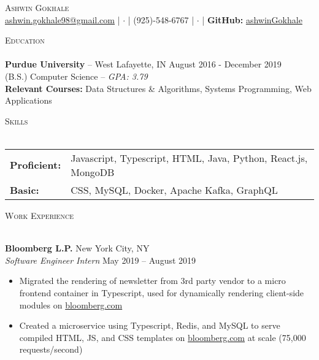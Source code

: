 \documentclass[letterpaper, 10pt]{article}
\newcommand{\lineunder} {
    \vspace*{-8pt} \\
    \hspace*{-18pt} \hrulefill \\
}
\newcommand{\header} [1] {
    {
        \hspace*{-18pt}\vspace*{6pt}
        {\large\textsc{#1}}
    }
    \vspace*{-6pt} \lineunder
}
\newcommand{\contact} [2] {
    \vspace*{-10pt}
    \begin{center}
        {\Huge \scshape {#1}}
        \vspace*{5pt}
        \\ #2
    \end{center}
    \vspace*{-10pt}
}
\begin{document}
\vspace*{20pt}



\vspace*{-10pt}
\contact{Ashwin Gokhale}{
	\href{mailto:ashwin.gokhale98@gmail.com}{ashwin.gokhale98@gmail.com} |
	$\cdot$ | (925)-548-6767 | $\cdot$ |
	\textbf{GitHub:}
	\href{https://goo.gl/R79aeK}{ashwinGokhale}
}

\vspace{10pt}

\header{Education}
\textbf{Purdue University} -- West Lafayette, IN
\hfill August 2016 - December 2019\\
(B.S.) Computer Science -- \textit{GPA: 3.79}
\\

\textbf{Relevant Courses:} Data Structures \& Algorithms, Systems Programming, Web Applications
\vspace{2mm}

\vspace{1mm}
\header{Skills}
\vspace{1mm}
\begin{tabular}{ l l }
	\textbf{Proficient:} & Javascript, Typescript, HTML, Java, Python, React.js, MongoDB \\
	\textbf{Basic:}      & CSS, MySQL, Docker, Apache Kafka, GraphQL \\
\end{tabular}
\vspace{2mm}

\header{Work Experience}
\vspace{1mm}

\textbf{Bloomberg L.P.} \hfill New York City, NY\\
\textit{Software Engineer Intern} \hfill May 2019 -- August 2019\\
\vspace{-1mm}
\begin{itemize} \itemsep 1pt
	\item Migrated the rendering of newsletter from 3rd party vendor to a micro frontend container in Typescript, used for dynamically rendering client-side modules on \href{https://www.bloomberg.com}{bloomberg.com}
	\item Created a microservice using Typescript, Redis, and MySQL to serve compiled HTML, JS, and CSS templates on
	\href{https://www.bloomberg.com}{bloomberg.com} at scale (75,000 requests/second)
\end{itemize}
\end{document}

